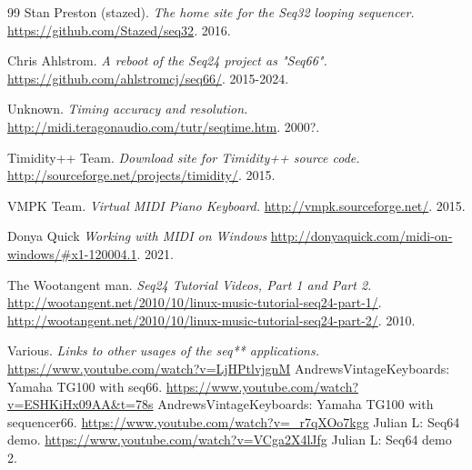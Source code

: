 {\begin{thebibliography}{99}
   Stan Preston (stazed).
   \emph{The home site for the Seq32 looping sequencer.}
   \url{https://github.com/Stazed/seq32}.
   2016.

   Chris Ahlstrom.
   \emph{A reboot of the Seq24 project as "Seq66".}
   \url{https://github.com/ahlstromcj/seq66/}.
   2015-2024.

   Unknown.
   \emph{Timing accuracy and resolution.}
   \url{http://midi.teragonaudio.com/tutr/seqtime.htm}.
   2000?.

   Timidity++ Team.
   \emph{Download site for Timidity++ source code.}
   \url{http://sourceforge.net/projects/timidity/}.
   2015.

   VMPK Team.
   \emph{Virtual MIDI Piano Keyboard.}
   \url{http://vmpk.sourceforge.net/}.
   2015.

   Donya Quick
   \emph{Working with MIDI on Windows}
   \url{http://donyaquick.com/midi-on-windows/#x1-120004.1}.
   2021.

   The Wootangent man.
   \emph{Seq24 Tutorial Videos, Part 1 and Part 2.}
   \url{http://wootangent.net/2010/10/linux-music-tutorial-seq24-part-1/}.
   \url{http://wootangent.net/2010/10/linux-music-tutorial-seq24-part-2/}.
   2010.

   Various.
   \emph{Links to other usages of the seq** applications.}
   \url{https://www.youtube.com/watch?v=LjHPtlvjgnM}
      AndrewsVintageKeyboards: Yamaha TG100 with seq66.
   \url{https://www.youtube.com/watch?v=ESHKiHx09AA&t=78s}
      AndrewsVintageKeyboards: Yamaha TG100 with sequencer66.
   \url{https://www.youtube.com/watch?v=\_r7qXOo7kgg}
      Julian L: Seq64 demo.
   \url{https://www.youtube.com/watch?v=VCga2X4lJfg}
      Julian L: Seq64 demo 2.
\end{thebibliography}
}

